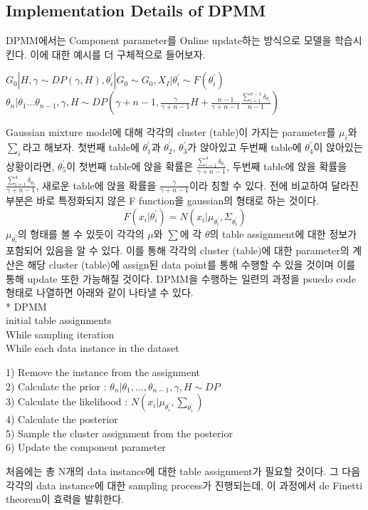 \documentclass[a4paper]{oblivoir}
\begin{document}
\subsection{Implementation Details of DPMM}
DPMM에서는 Component parameter를 Online update하는 방식으로 모델을 학습시킨다. 이에 대한 예시를 더 구체적으로 들어보자.
\begin{center}
$G_{0}|H,\gamma \sim DP(\gamma,H), \theta^{'}_{i}|G_{0} \sim G_{0}, X_{I}|\theta^{'}_{i} \sim F(\theta^{'}_{i})$\\
$\theta_{n}|\theta_{1}...\theta_{n-1},\gamma,H \sim DP(\gamma+n-1,\frac{\gamma}{\gamma+n-1}H + \frac{n-1}{\gamma+n-1}\frac{\sum^{n-1}_{i=1}\delta_{\theta_{i}}}{n-1})$
\end{center}
Gaussian mixture model에 대해 각각의 cluster (table)이 가지는 parameter를 $\mu_{i}$와 $\sum_{i}$라고 해보자. 첫번째 table에 $\theta^{'}_{1}$과 $\theta^{'}_{2}$, $\theta^{'}_{3}$가 앉아있고 두번째 table에 $\theta^{'}_{4}$이 앉아있는 상황이라면, $\theta^{'}_{5}$이 첫번째 table에 앉을 확률은 $\frac{\sum^{4}_{i=1}\delta_{\theta_{1}}}{\gamma+n-1}$, 두번째 table에 앉을 확률을 $\frac{\sum^{4}_{i=1}\delta_{\theta_{2}}}{\gamma+n-1}$, 새로운 table에 앉을 확률을 $\frac{\gamma}{\gamma+n-1}$이라 칭할 수 있다. 전에 비교하여 달라진 부분은 바로 특정화되지 않은 F function을 gaussian의 형태로 하는 것이다. 
\begin{equation}
F(x_{i}|\theta^{'}_{i})=N(x_{i}|\mu_{\theta^{'}_{i}},\Sigma_{\theta^{'}_{i}})
\end{equation}
$\mu_{\theta^{'}_{i}}$의 형태를 볼 수 있듯이 각각의 $\mu$와 $\sum$에 각 $\theta$의 table assignment에 대한 정보가 포함되어 있음을 알 수 있다. 이를 통해 각각의 cluster (table)에 대한 parameter의 계산은 해당 cluster (table)에 assign된 data point를 통해 수행할 수 있을 것이며 이를 통해 update 또한 가능해질 것이다. DPMM을 수행하는 일련의 과정을 psuedo code 형태로 나열하면 아래와 같이 나타낼 수 있다.\\

* DPMM\\
 initial table assignments\\
 While sampling iteration\\
 While each data instance in the dataset
 \begin{center}
  1) Remove the instance from the assignment\\
  2) Calculate the prior : $\theta_{n}|\theta_{1},...,\theta_{n-1},\gamma,H \sim DP$\\
  3) Calculate the likelihood : $N(x_{i}|\mu_{\theta^{'}_{i}},\sum_{\theta^{'}_{i}})$\\
  4) Calculate the posterior\\
  5) Sample the cluster assignment from the posterior\\
  6) Update the component parameter\\
  \end{center}
처음에는 총 N개의 data instance에 대한 table assignment가 필요할 것이다. 그 다음 각각의 data instance에 대한 sampling process가 진행되는데, 이 과정에서 de Finetti theorem이 효력을 발휘한다.
\end{document}
